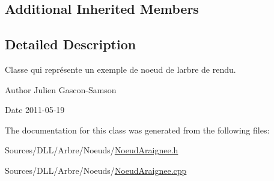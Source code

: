 \subsection*{Additional Inherited Members}


\subsection{Detailed Description}
Classe qui représente un exemple de noeud de l\textquotesingle{}arbre de rendu. 

\begin{DoxyAuthor}{Author}
Julien Gascon-\/\+Samson 
\end{DoxyAuthor}
\begin{DoxyDate}{Date}
2011-\/05-\/19 
\end{DoxyDate}


The documentation for this class was generated from the following files\+:\begin{DoxyCompactItemize}
\item 
Sources/\+D\+L\+L/\+Arbre/\+Noeuds/\hyperlink{_noeud_araignee_8h}{Noeud\+Araignee.\+h}\item 
Sources/\+D\+L\+L/\+Arbre/\+Noeuds/\hyperlink{_noeud_araignee_8cpp}{Noeud\+Araignee.\+cpp}\end{DoxyCompactItemize}
